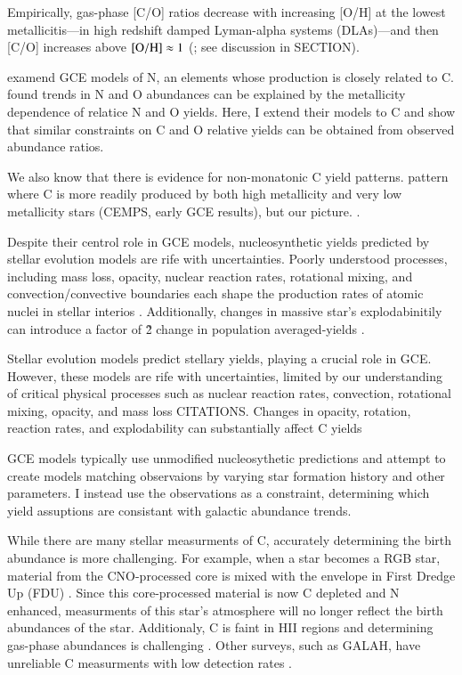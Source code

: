 \documentclass[12pt,oneside]{report}
\begin{document}
Empirically, gas-phase [C/O] ratios decrease with increasing [O/H] at the lowest metallicitis---in high redshift damped Lyman-alpha systems (DLAs)---and then [C/O] increases above $\rm [O/H] \approx 1$ (\citealt{berg+19,cooke+17}; see discussion in SECTION).

\cite{james+22} examend GCE models of N, an elements whose production is closely related to C. \cite{james+22} found trends in N and O abundances can be explained by the metallicity dependence of relatice N and O yields. Here, I extend their models to C and show that similar constraints on C and O relative yields can be obtained from observed abundance ratios.

We also know that there is evidence for non-monatonic C yield patterns. 
pattern where C is more readily produced by both high metallicity and very low metallicity stars (CEMPS, early GCE results), but our picture. \citep{FN15,cooke+17,berg+19}.

Despite their centrol role in GCE models, nucleosynthetic yields predicted by stellar evolution models are rife with uncertainties. Poorly understood processes, including mass loss, opacity, nuclear reaction rates, rotational mixing, and convection/convective boundaries each shape the production rates of atomic nuclei in stellar interios \citep{KL14,V13, LC18, emily+21}.
Additionally, changes in massive star's explodabinitily can introduce a factor of \~2 change in population averaged-yields \citep{emily+21}.

Stellar evolution models predict stellary yields, playing a crucial role in GCE.  However, these models are rife with uncertainties, limited by our understanding of critical physical processes such as nuclear reaction rates, convection, rotational mixing, opacity, and mass loss CITATIONS. Changes in opacity, rotation, reaction rates, and explodability can substantially affect C yields 

GCE models typically use unmodified nucleosythetic predictions and attempt to create models matching observaions by varying star formation history and other parameters. I instead use the observations as a constraint, determining which yield assuptions are consistant with galactic abundance trends. 

While there are many stellar measurments of C, accurately determining the birth abundance is more challenging. For example, when a star becomes a RGB star, material from the CNO-processed core is mixed with the envelope in First Dredge Up (FDU) \citep{fiorenzo+21,KL14}. Since this core-processed material is now C depleted and N enhanced, measurments of this star's atmosphere will no longer reflect the birth abundances of the star.  Additionaly, C is faint in HII regions and determining gas-phase abundances is challenging \citet{skillman+20}.
Other surveys, such as GALAH, have unreliable C measurments with low detection rates \citep{emily+19}.
\end{document}
